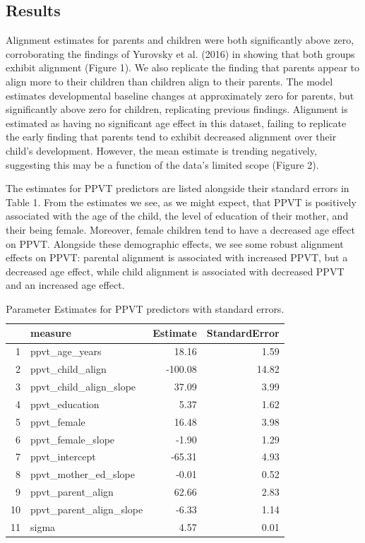 \documentclass[10pt, letterpaper]{article}
\begin{document}
\hypertarget{results}{%
\subsection{Results}\label{results}}

Alignment estimates for parents and children were both significantly
above zero, corroborating the findings of Yurovsky et al. (2016) in
showing that both groups exhibit alignment (Figure 1). We also replicate
the finding that parents appear to align more to their children than
children align to their parents. The model estimates developmental
baseline changes at approximately zero for parents, but significantly
above zero for children, replicating previous findings. Alignment is
estimated as having no significant age effect in this dataset, failing
to replicate the early finding that parents tend to exhibit decreased
alignment over their child's development. However, the mean estimate is
trending negatively, suggesting this may be a function of the data's
limited scope (Figure 2).

The estimates for PPVT predictors are listed alongside their standard
errors in Table 1. From the estimates we see, as we might expect, that
PPVT is positively associated with the age of the child, the level of
education of their mother, and their being female. Moreover, female
children tend to have a decreased age effect on PPVT. Alongside these
demographic effects, we see some robust alignment effects on PPVT:
parental alignment is associated with increased PPVT, but a decreased
age effect, while child alignment is associated with decreased PPVT and
an increased age effect.

\begin{table}[H]
\centering
\begin{tabular}{rlrr}
  \hline
 & measure & Estimate & StandardError \\ 
  \hline
1 & ppvt\_age\_years & 18.16 & 1.59 \\ 
  2 & ppvt\_child\_align & -100.08 & 14.82 \\ 
  3 & ppvt\_child\_align\_slope & 37.09 & 3.99 \\ 
  4 & ppvt\_education & 5.37 & 1.62 \\ 
  5 & ppvt\_female & 16.48 & 3.98 \\ 
  6 & ppvt\_female\_slope & -1.90 & 1.29 \\ 
  7 & ppvt\_intercept & -65.31 & 4.93 \\ 
  8 & ppvt\_mother\_ed\_slope & -0.01 & 0.52 \\ 
  9 & ppvt\_parent\_align & 62.66 & 2.83 \\ 
  10 & ppvt\_parent\_align\_slope & -6.33 & 1.14 \\ 
  11 & sigma & 4.57 & 0.01 \\ 
   \hline
\end{tabular}
\caption{Parameter Estimates for PPVT predictors with standard errors.} 
\end{table}
\end{document}
